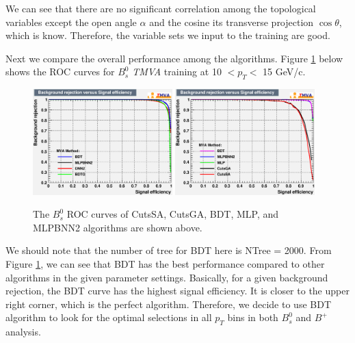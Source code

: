 We can see that there are no significant correlation among the topological variables except the open angle $\alpha$ and the cosine its transverse projection $ \cos\theta$, which is know. Therefore, the variable sets we input to the  training are good.  

Next we compare the overall performance among the algorithms. Figure \ref{ROCAll} below shows the ROC curves for $B^0_s$ \textit{TMVA} training at 10 $< p_T < $ 15 GeV/c.

\begin{figure}[h]
\begin{center}
\includegraphics[width= 0.48\textwidth]{Figures/Chapter5/BsROC1015.eps}
\includegraphics[width= 0.48\textwidth]{Figures/Chapter5/BsROC1520.eps}
\caption{The $B^0_s$ ROC curves of CutsSA, CutsGA, BDT, MLP, and MLPBNN2 algorithms are shown above.}
\label{ROCAll}
\end{center}
\end{figure}

We should note that the number of tree for BDT here is NTree = 2000. From Figure \ref{ROCAll}, we can see that BDT has the best performance compared to other algorithms in the given parameter settings. Basically, for a given background rejection, the BDT curve has the highest signal efficiency. It is closer to the upper right corner, which is the perfect algorithm. Therefore, we decide to use BDT algorithm to look for the optimal selections in all $p_T$ bins in both $B^0_s$ and $B^+$ analysis.


